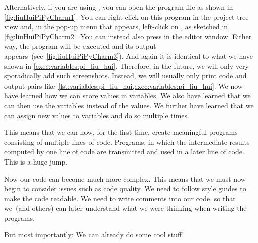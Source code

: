 Alternatively, if you are using \pycharm, you can open the program file  as shown in \cref{fig:liuHuiPiPyCharm1}.
You can right-click on this program in the project tree view and, in the pop-up menu that appears, left-click on , as sketched in \cref{fig:liuHuiPiPyCharm2}.
You can instead also press  in the editor window.
Either way, the program will be executed and its output appears~(see~\cref{fig:liuHuiPiPyCharm3}).
And again it is identical to what we have shown in \cref{exec:variables:pi_liu_hui}.
Therefore, in the future, we will only very sporadically add such screenshots.
Instead, we will usually only print code and output pairs like~\cref{lst:variables:pi_liu_hui,exec:variables:pi_liu_hui}.%
%
\endhsection%
%
%
%
We now have learned how we can store values in variables.
We also have learned that we can then use the variables instead of the values.
We further have learned that we can assign new values to variables and do so multiple times.

This means that we can now, for the first time, create meaningful programs consisting of multiple lines of code.
Programs, in which the intermediate results computed by one line of code are transmitted and used in a later line of code.
This is a huge jump.

Now our code can become much more complex.
This means that we must now begin to consider issues such as code quality.
We need to follow style guides to make the code readable.
We need to write comments into our code, so that we~(and others) can later understand what we were thinking when writing the programs.

But most importantly:
We can already do some cool stuff!%
\endhsection%
%
\FloatBarrier%
\endhsection%
%
